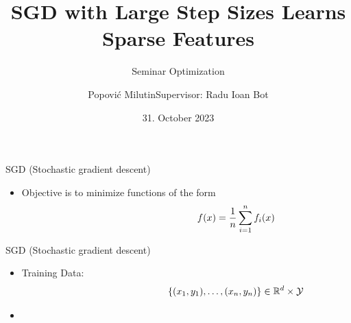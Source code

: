 \documentclass[fleqn]{beamer}
\title
{SGD with Large Step Sizes Learns Sparse Features}
\subtitle{Seminar Optimization}
\author[Popović Milutin]
{Popović Milutin\newline\newline Supervisor: Radu Ioan Bot}
\date{31. October 2023}
\begin{document}
    \begin{frame}
        \titlepage
    \end{frame}

    \begin{frame}{SGD (Stochastic gradient descent)}
        \begin{itemize}
            \item Objective is to minimize functions of the
                form
                \begin{align*}
                    \hspace{0.3\linewidth}
                    f(x) = \frac{1}{n} \sum_{i=1}^{n} f_i(x)
            \end{align*}
        \end{itemize}
    \end{frame}

    \begin{frame}{SGD (Stochastic gradient descent)}
        \begin{itemize}
            \item Training Data:
                \begin{align*}
                    \hspace{0.3\linewidth}
                    \{(x_1, y_1),\ldots,(x_n,y_n)\} \in \mathbb{R}^{d} \times
                    \mathcal{Y}
            \end{align*}
        \item \mbox{}
        \end{itemize}
    \end{frame}
\end{document}
